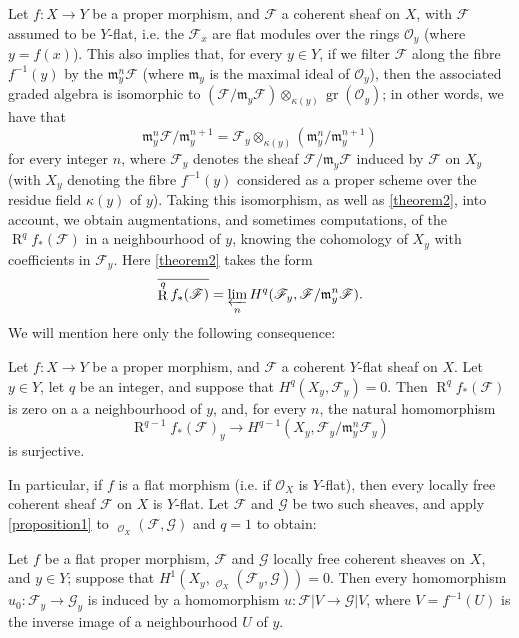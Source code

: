 \documentclass{article}
\theoremstyle{plain}
\newenvironment{theorem}[1]
  {\renewcommand\theinnercustomtheorem{#1}\innercustomtheorem}
  {\endinnercustomtheorem}
\newenvironment{proposition}[1]
  {\renewcommand\theinnercustomproposition{#1}\innercustomproposition}
  {\endinnercustomproposition}
\theoremstyle{definition}
\newcommand{\sh}{\mathscr}
\newcommand{\fk}{\mathfrak}
\newcommand{\kres}{\kappa}
\DeclareMathOperator{\RR}{R}
\DeclareMathOperator{\Hom}{Hom}
\DeclareMathOperator{\shHom}{\underline{\Hom}}
\DeclareMathOperator{\gr}{gr}
\newcommand{\oldpage}[1]{\marginpar{\footnotesize$\Big\vert$ \textit{p.~#1}}}
\begin{document}
Let $f\colon X\to Y$ be a proper morphism, and $\sh{F}$ a coherent sheaf on $X$,
\oldpage{182-09}
with $\sh{F}$ assumed to be $Y$-flat, i.e. the $\sh{F}_x$ are flat modules over the rings $\sh{O}_y$ (where $y=f(x)$).
This also implies that, for every $y\in Y$, if we filter $\sh{F}$ along the fibre $f^{-1}(y)$ by the $\fk{m}_y^n\sh{F}$ (where $\fk{m}_y$ is the maximal ideal of $\sh{O}_y$), then the associated graded algebra is isomorphic to $(\sh{F}/\fk{m}_y\sh{F})\otimes_{\kres(y)}\gr(\sh{O}_y)$;
in other words, we have that
\[
  \fk{m}_y^n\sh{F}/\fk{m}_y^{n+1}
  = \sh{F}_y\otimes_{\kres(y)}(\fk{m}_y^n/\fk{m}_y^{n+1})
\]
for every integer $n$, where $\sh{F}_y$ denotes the sheaf $\sh{F}/\fk{m}_y\sh{F}$ induced by $\sh{F}$ on $X_y$ (with $X_y$ denoting the fibre $f^{-1}(y)$ considered as a proper scheme over the residue field $\kres(y)$ of $y$).
Taking this isomorphism, as well as \cref{theorem2}, into account, we obtain augmentations, and sometimes computations, of the $\RR^q f_*(\sh{F})$ in a neighbourhood of $y$, knowing the cohomology of $X_y$ with coefficients in $\sh{F}_y$.
Here \cref{theorem2} takes the form
\[
  \overline{\RR^q f_*(\sh{F})} = \varprojlim_n H^q(\sh{F}_y,\sh{F}/\fk{m}_y^n\sh{F}).
\]
We will mention here only the following consequence:

\begin{proposition}{1}
\label{proposition1}
  Let $f\colon X\to Y$ be a proper morphism, and $\sh{F}$ a coherent $Y$-flat sheaf on $X$.
  Let $y\in Y$, let $q$ be an integer, and suppose that $H^q(X_y,\sh{F}_y)=0$.
  Then $\RR^q f_*(\sh{F})$ is zero on a a neighbourhood of $y$, and, for every $n$, the natural homomorphism
  \[
    \RR^{q-1}f_*(\sh{F})_y \to H^{q-1}(X_y,\sh{F}_y/\fk{m}_y^n\sh{F}_y)
  \]
  is surjective.
\end{proposition}

In particular, if $f$ is a flat morphism (i.e. if $\sh{O}_X$ is $Y$-flat), then every locally free coherent sheaf $\sh{F}$ on $X$ is $Y$-flat.
Let $\sh{F}$ and $\sh{G}$ be two such sheaves, and apply \cref{proposition1} to $\shHom_{\sh{O}_X}(\sh{F},\sh{G})$ and $q=1$ to obtain:

\begin{theorem}{7}
\label{theorem7}
  Let $f$ be a flat proper morphism, $\sh{F}$ and $\sh{G}$ locally free coherent sheaves on $X$, and $y\in Y$;
  suppose that $H^1(X_y,\shHom_{\sh{O}_X}(\sh{F}_y,\sh{G}))=0$.
  Then every homomorphism $u_0\colon\sh{F}_y\to\sh{G}_y$ is induced by a homomorphism $u\colon\sh{F}|V\to\sh{G}|V$, where $V=f^{-1}(U)$ is the inverse image of a neighbourhood $U$ of $y$.
\end{theorem}
\end{document}
